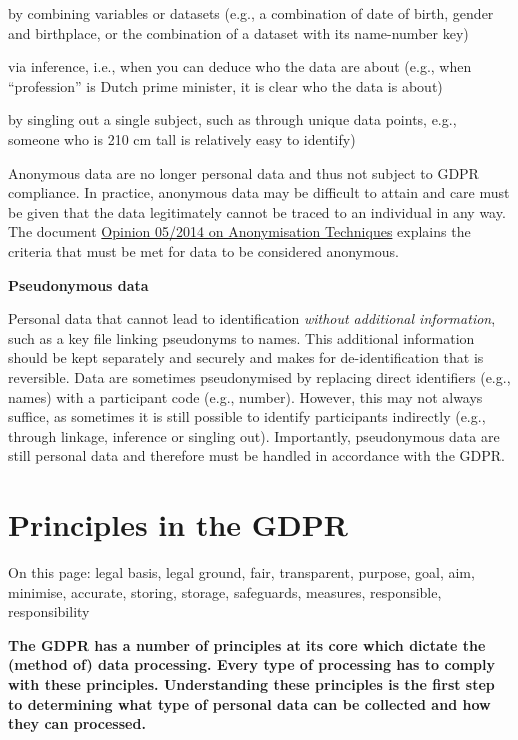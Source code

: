 \documentclass[
]{book}
\begin{document}
by combining variables or datasets (e.g., a combination of date of birth, gender and birthplace, or the combination of a dataset with its name-number key)

via inference, i.e., when you can deduce who the data are about (e.g., when ``profession'' is Dutch prime minister, it is clear who the data is about)

by singling out a single subject, such as through unique data points, e.g., someone who is 210 cm tall is relatively easy to identify)

Anonymous data are no longer personal data and thus not subject to GDPR
compliance. In practice, anonymous data may be difficult to attain and care must be given that the data legitimately cannot be traced to an individual in any way. The document \href{https://ec.europa.eu/justice/article-29/documentation/opinion-recommendation/files/2014/wp216_en.pdf}{Opinion 05/2014 on Anonymisation Techniques} explains the criteria that must be met for data to be considered anonymous.

\textbf{Pseudonymous data}

Personal data that cannot lead to identification \emph{without additional information}, such as a key file linking pseudonyms to names. This additional information should be kept separately and securely and makes for de-identification that is reversible. Data are sometimes pseudonymised by replacing direct identifiers (e.g., names) with a participant code (e.g., number). However, this may not always suffice, as sometimes it is still possible to identify participants indirectly (e.g., through linkage, inference or singling out). Importantly, pseudonymous data are still personal data and therefore must be handled in accordance with the GDPR.

\hypertarget{gdpr-principles}{%
\section{Principles in the GDPR}\label{gdpr-principles}}

On this page: legal basis, legal ground, fair, transparent, purpose, goal, aim,
minimise, accurate, storing, storage, safeguards, measures, responsible,
responsibility

\textbf{The GDPR has a number of principles at its core which dictate the (method of)
data processing. Every type of processing has to comply with these principles.
Understanding these principles is the first step to determining what type of
personal data can be collected and how they can processed.}
\end{document}
